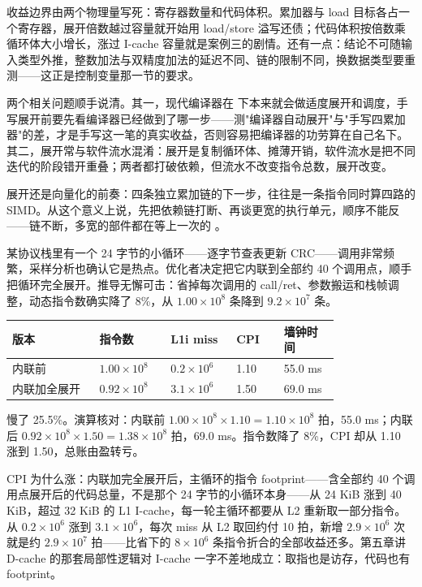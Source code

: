 收益边界由两个物理量写死：寄存器数量和代码体积。累加器与 load 目标各占一个寄存器，展开倍数越过容量就开始用 load/store 溢写还债；代码体积按倍数乘循环体大小增长，涨过 I-cache 容量就是案例三的剧情。还有一点：结论不可随输入类型外推，整数加法与双精度加法的延迟不同、链的限制不同，换数据类型要重测——这正是控制变量那一节的要求。

两个相关问题顺手说清。其一，现代编译器在  下本来就会做适度展开和调度，手写展开前要先看编译器已经做到了哪一步——测"编译器自动展开"与"手写四累加器"的差，才是手写这一笔的真实收益，否则容易把编译器的功劳算在自己名下。其二，展开常与软件流水混淆：展开是复制循环体、摊薄开销，软件流水是把不同迭代的阶段错开重叠；两者都打破依赖，但流水不改变指令总数，展开改变。

展开还是向量化的前奏：四条独立累加链的下一步，往往是一条指令同时算四路的 SIMD。从这个意义上说，先把依赖链打断、再谈更宽的执行单元，顺序不能反——链不断，多宽的部件都在等上一次的 。

某协议栈里有一个 24 字节的小循环——逐字节查表更新 CRC——调用非常频繁，采样分析也确认它是热点。优化者决定把它内联到全部约 40 个调用点，顺手把循环完全展开。推导无懈可击：省掉每次调用的 call/ret、参数搬运和栈帧调整，动态指令数确实降了 8\%，从 $1.00\times10^{8}$ 条降到 $9.2\times10^{7}$ 条。

\begin{longtable}{L{0.22\linewidth}L{0.16\linewidth}L{0.16\linewidth}L{0.12\linewidth}L{0.14\linewidth}}
\toprule
版本 & 指令数 & L1i miss & CPI & 墙钟时间 \\
\midrule
内联前 & $1.00\times10^{8}$ & $0.2\times10^{6}$ & 1.10 & 55.0 ms \\
内联加全展开 & $0.92\times10^{8}$ & $3.1\times10^{6}$ & 1.50 & 69.0 ms \\
\bottomrule
\end{longtable}

慢了 25.5\%。演算核对：内联前 $1.00\times10^{8}\times1.10=1.10\times10^{8}$ 拍，55.0 ms；内联后 $0.92\times10^{8}\times1.50=1.38\times10^{8}$ 拍，69.0 ms。指令数降了 8\%，CPI 却从 1.10 涨到 1.50，总账由盈转亏。

CPI 为什么涨：内联加完全展开后，主循环的指令 footprint——含全部约 40 个调用点展开后的代码总量，不是那个 24 字节的小循环本身——从 24 KiB 涨到 40 KiB，超过 32 KiB 的 L1 I-cache，每一轮主循环都要从 L2 重新取一部分指令。 从 $0.2\times10^{6}$ 涨到 $3.1\times10^{6}$，每次 miss 从 L2 取回约付 10 拍，新增 $2.9\times10^{6}$ 次就是约 $2.9\times10^{7}$ 拍——比省下的 $8\times10^{6}$ 条指令折合的全部收益还多。第五章讲 D-cache 的那套局部性逻辑对 I-cache 一字不差地成立：取指也是访存，代码也有 footprint。

